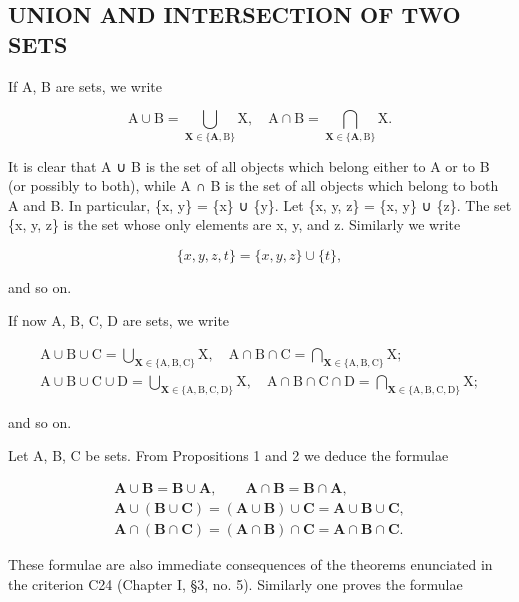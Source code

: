 \subsection{UNION AND INTERSECTION OF TWO SETS}

If A, B are sets, we write

\[
\mathrm{A} \cup \mathrm{B} = \bigcup_ {\mathbf {X} \in \{\mathbf {A}, \mathrm{B} \}} \mathrm{X}, \quad \mathrm{A} \cap \mathrm{B} = \bigcap_ {\mathbf {X} \in \{\mathbf {A}, \mathrm{B} \}} \mathrm{X}.
\]

It is clear that A ∪ B is the set of all objects which belong either to A or to B (or possibly to both), while A ∩ B is the set of all objects which belong to both A and B. In particular, \{x, y\} = \{x\} ∪ \{y\}. Let \{x, y, z\} = \{x, y\} ∪ \{z\}. The set \{x, y, z\} is the set whose only elements are x, y, and z. Similarly we write

\[
\{x, y, z, t \} = \{x, y, z \} \cup \{t \},
\]

and so on.

If now A, B, C, D are sets, we write

\[
\begin{array}{c} \mathrm {A \cup B \cup C = \bigcup_ {\mathbf {X} \in \{\mathrm{A,B,C} \}} X, \quad A \cap B \cap C = \bigcap_ {\mathbf {X} \in \{\mathrm{A,B,C} \}} X;} \\ \mathrm {A \cup B \cup C \cup D = \bigcup_ {\mathbf {X} \in \{\mathrm{A,B,C,D} \}} X, \quad A \cap B \cap C \cap D = \bigcap_ {\mathbf {X} \in \{\mathrm{A,B,C,D} \}} X;} \end{array}
\]

and so on.

Let A, B, C be sets. From Propositions 1 and 2 we deduce the formulae

\[
\begin{array}{c} \mathbf {A} \cup \mathbf {B} = \mathbf {B} \cup \mathbf {A}, \qquad \mathbf {A} \cap \mathbf {B} = \mathbf {B} \cap \mathbf {A}, \\ \mathbf {A} \cup (\mathbf {B} \cup \mathbf {C}) = (\mathbf {A} \cup \mathbf {B}) \cup \mathbf {C} = \mathbf {A} \cup \mathbf {B} \cup \mathbf {C}, \\ \mathbf {A} \cap (\mathbf {B} \cap \mathbf {C}) = (\mathbf {A} \cap \mathbf {B}) \cap \mathbf {C} = \mathbf {A} \cap \mathbf {B} \cap \mathbf {C}. \end{array}
\]

These formulae are also immediate consequences of the theorems enunciated in the criterion C24 (Chapter I, §3, no. 5). Similarly one proves the formulae

